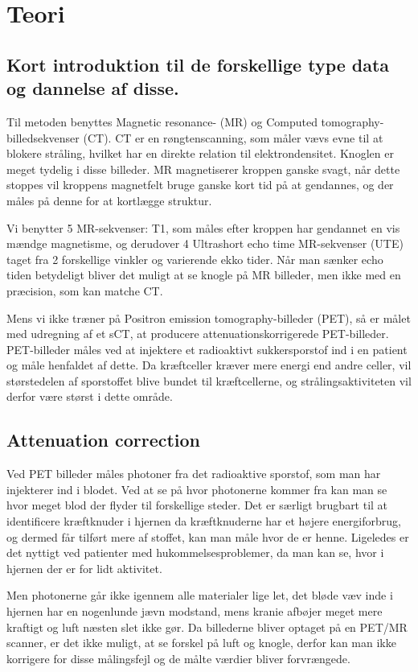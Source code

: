 \section{Teori}
\subsection{Kort introduktion til de forskellige type data og dannelse af disse.}


Til metoden benyttes Magnetic resonance- (MR) og Computed
tomography-billedsekvenser (CT). CT er en røngtenscanning, som måler
vævs evne til at blokere stråling, hvilket har en direkte relation
til elektrondensitet. Knoglen er meget tydelig i disse billeder. MR
magnetiserer kroppen ganske svagt, når dette stoppes vil kroppens
magnetfelt bruge ganske kort tid på at gendannes, og der måles på
denne for at kortlægge struktur.

Vi benytter 5 MR-sekvenser: T1, som måles efter kroppen har gendannet en vis
mændge magnetisme, og derudover 4 Ultrashort echo time MR-sekvenser (UTE)
taget fra 2 forskellige vinkler og varierende ekko tider. Når man sænker echo
tiden betydeligt bliver det muligt at se knogle på MR billeder, men ikke med
en præcision, som kan matche CT.

Mens vi ikke træner på Positron emission tomography-billeder (PET), så
er målet med udregning af et sCT, at producere attenuationskorrigerede
PET-billeder. PET-billeder måles ved at injektere et radioaktivt
sukkersporstof ind i en patient og måle henfaldet af dette. Da
kræftceller kræver mere energi end andre celler, vil størstedelen af
sporstoffet blive bundet til kræftcellerne, og strålingsaktiviteten
vil derfor være størst i dette område.

\subsection{Attenuation correction} 

Ved PET billeder måles photoner fra det radioaktive sporstof, som man
har injekterer ind i blodet. Ved at se på hvor photonerne kommer fra kan
man se hvor meget blod der flyder til forskellige steder. Det er særligt
brugbart til at identificere kræftknuder i hjernen da kræftknuderne har
et højere energiforbrug, og dermed får tilført mere af stoffet, kan
man måle hvor de er henne. Ligeledes er det nyttigt ved patienter med
hukommelsesproblemer, da man kan se, hvor i hjernen der er for lidt
aktivitet.

Men photonerne går ikke igennem alle materialer lige let, det bløde væv
inde i hjernen har en nogenlunde jævn modstand, mens kranie afbøjer
meget mere kraftigt og luft næsten slet ikke gør. Da billederne bliver
optaget på en PET/MR scanner, er det ikke muligt, at se forskel på luft
og knogle, derfor kan man ikke korrigere for disse målingsfejl og de
målte værdier bliver forvrængede.

